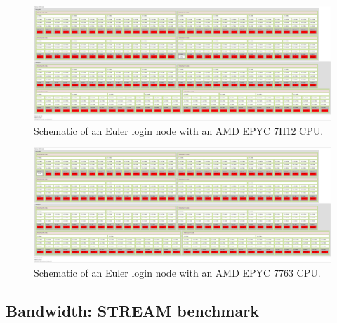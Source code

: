 \documentclass[unicode,11pt,a4paper,oneside,numbers=endperiod,openany]{scrartcl}
\begin{document}
\begin{figure}[H]
    \centering
    \includegraphics[width=\textwidth]{Images/AMD_EPYC_7H12.pdf}
    \caption{Schematic of an Euler login node with an AMD EPYC 7H12 CPU.}
    \label{fig:memory_euler_7H12}
\end{figure}

\begin{figure}[H]
    \centering
    \includegraphics[width=\textwidth]{Images/AMD_EPYC_7763.pdf}
    \caption{Schematic of an Euler login node with an AMD EPYC 7763 CPU.}
    \label{fig:memory_euler_7763}
\end{figure}

\subsection{Bandwidth: STREAM benchmark}
\end{document}
